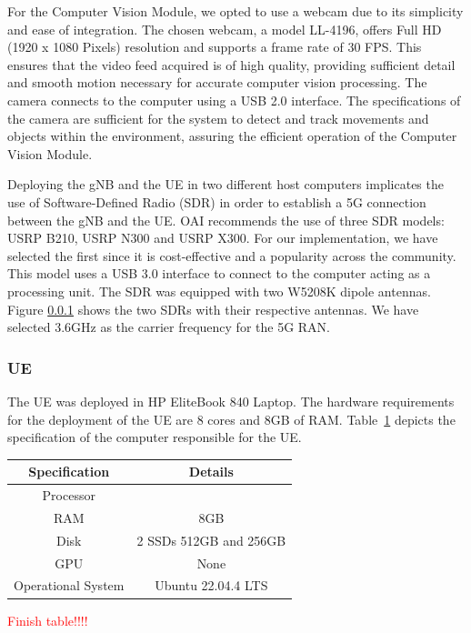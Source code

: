 For the Computer Vision Module, we opted to use a webcam due to its simplicity and ease of integration.
The chosen webcam, a model LL-4196, offers Full HD (1920 x 1080 Pixels) resolution and supports a frame rate of 30 FPS\@.
This ensures that the video feed acquired is of high quality, providing sufficient detail and smooth motion necessary for accurate computer vision processing.
The camera connects to the computer using a USB 2.0 interface.
The specifications of the camera are sufficient for the system to detect and track movements and objects within the environment, assuring the efficient operation of the Computer Vision Module.


Deploying the gNB and the UE in two different host computers implicates the use of Software-Defined Radio (SDR) in order to establish a 5G connection between the gNB and the UE.
OAI recommends the use of three SDR models: USRP B210, USRP N300 and USRP X300\@ \cite{}. %
For our implementation, we have selected the first since it is cost-effective and a popularity across the community.
This model uses a USB 3.0 interface to connect to the computer acting as a processing unit.
The SDR was equipped with two W5208K dipole antennas.
Figure \ref{} shows the two SDRs with their respective antennas.
We have selected 3.6GHz as the carrier frequency for the 5G RAN.

\subsubsection{UE}
The UE was deployed in HP EliteBook 840 Laptop.
The hardware requirements for the deployment of the UE are 8 cores and 8GB of RAM\@.
Table~\ref{tab:specs_pc_ue} depicts the specification of the computer responsible for the UE\@.

\begin{table}[H]
    \begin{tabular}{|c|c|}
        \hline
        \textbf{Specification} & \textbf{Details} \\ \hline
        Processor                      &              \\ \hline
        RAM                      &          8GB        \\ \hline
        Disk                      &   2 SSDs  512GB and 256GB         \\ \hline
        GPU                     &   None                \\ \hline
        Operational System & Ubuntu 22.04.4 LTS                  \\ \hline  %
    \end{tabular}\label{tab:specs_pc_ue}
\end{table}
\textcolor{red}{Finish table!!!!}


